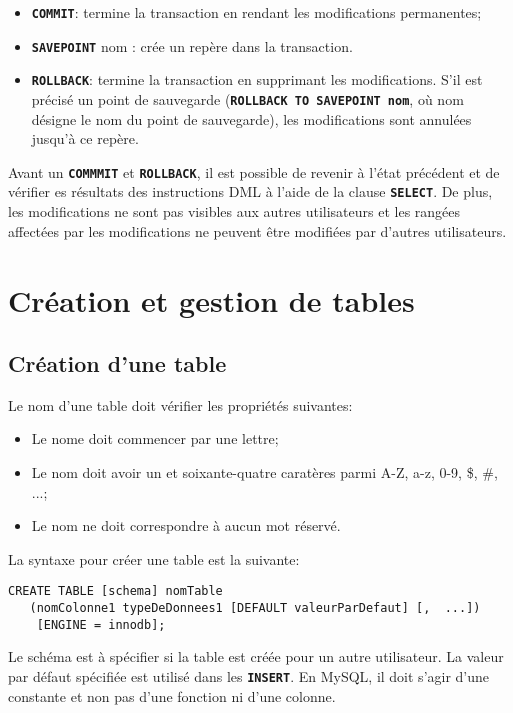 \documentclass[a4paper, 12pt]{report}
\newcommand{\textSQL}[1]{\texttt{\textbf{#1}}}
\theoremstyle{definition} \newtheorem{ex}{Exemple}
\begin{document}
\begin{itemize}
\item \textSQL{COMMIT}: termine la transaction en rendant les modifications permanentes;
\item \textSQL{SAVEPOINT} nom : crée un repère dans la transaction.
\item \textSQL{ROLLBACK}: termine la transaction en supprimant les modifications. S'il est précisé un point de sauvegarde (\textSQL{ROLLBACK TO SAVEPOINT nom}, où nom désigne le nom du point de sauvegarde), les modifications sont annulées jusqu'à ce repère.
\end{itemize}

Avant un \textSQL{COMMMIT} et \textSQL{ROLLBACK}, il est possible de revenir à l'état précédent et de vérifier es résultats des instructions DML à l'aide de la clause \textSQL{SELECT}. De plus, les modifications ne sont pas visibles aux autres utilisateurs et les rangées affectées par les modifications ne peuvent être modifiées par d'autres utilisateurs.

\chapter{Création et gestion de tables}
\section{Création d'une table}
Le nom d'une table doit vérifier les propriétés suivantes:
\begin{itemize}
  \item Le nome doit commencer par une lettre;
	\item Le nom doit avoir un et soixante-quatre caratères parmi A-Z, a-z, 0-9, \$, \#, ...;
	\item Le nom ne doit correspondre à aucun mot réservé.
\end{itemize}

La syntaxe pour créer une table est la suivante:
\begin{lstlisting}[frame=single]
CREATE TABLE [schema] nomTable
   (nomColonne1 typeDeDonnees1 [DEFAULT valeurParDefaut] [,  ...])
	[ENGINE = innodb];
\end{lstlisting}
Le schéma est à spécifier si la table est créée pour un autre utilisateur. La valeur par défaut spécifiée est utilisé dans les \textSQL{INSERT}. En MySQL, il doit s'agir d'une constante et non pas d'une fonction ni d'une colonne.
\end{document}
